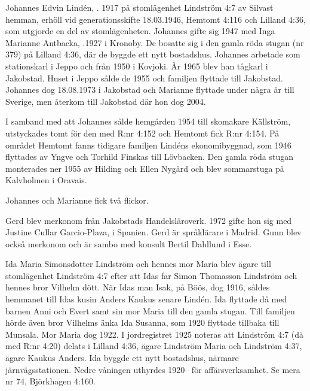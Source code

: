 %
Johannes Edvin Lindén, . 1917 på stomlägenhet Lindström 4:7 av Silvast hemman, erhöll vid generationsskifte 18.03.1946, Hemtomt 4:116 och Lilland 4:36, som utgjorde en del av stomlägenheten. Johannes gifte sig 1947 med Inga Marianne Antbacka, .1927 i Kronoby. De bosatte sig i den gamla röda stugan (nr 379) på Lilland 4:36, där de byggde ett nytt bostadshus. Johannes arbetade som stationskarl i Jeppo och från 1950 i Kovjoki. År 1965 blev han tågkarl i Jakobstad. Huset i Jeppo sålde de 1955 och familjen flyttade till Jakobstad. Johannes dog 18.08.1973 i Jakobstad och Marianne flyttade under några år till Sverige, men återkom till Jakobstad där hon dog 2004.

I samband med att Johannes sålde hemgården 1954 till skomakare Källström, utstyckades tomt för den med R:nr 4:152 och Hemtomt fick R:nr 4:154. På området Hemtomt fanns tidigare familjen Lindéns ekonomibyggnad, som 1946 flyttades av Yngve och Torhild Finskas till Lövbacken. Den gamla röda stugan monterades ner 1955 av Hilding och Ellen Nygård och blev sommarstuga på Kalvholmen i Oravais.

Johannes och Marianne fick två flickor.
\begin{jhchildren}
  \item {}
  \item {}
\end{jhchildren}
Gerd blev merkonom från Jakobstads Handelsläroverk. 1972 gifte hon sig med Justine Cullar Garcio-Plaza,  i Spanien. Gerd är språklärare i Madrid. Gunn blev också merkonom och är sambo med konsult Bertil Dahllund i Esse.


%
Ida Maria Simonsdotter Lindström och hennes mor Maria blev ägare till stomlägenhet Lindström 4:7 efter att Idas far Simon Thomasson Lindström och hennes bror Vilhelm dött. När Idas man Isak,  på Böös, dog 1916, såldes hemmanet till Idas kusin Anders Kaukus senare Lindén. Ida flyttade då med barnen Anni och Evert samt sin mor Maria till den gamla stugan. Till familjen hörde även bror Vilhelms änka Ida Susanna, som 1920 flyttade tillbaka till Munsala. Mor Maria dog 1922. I jordregistret 1925 noteras att Lindström 4:7 (då med R:nr 4:20) delats i Lilland 4:36, ägare Lindström Maria och Lindström 4:37, ägare Kaukus Anders. Ida byggde ett nytt bostadshus, närmare järnvägsstationen. Nedre våningen uthyrdes 1920-- för affärsverksamhet. Se mera nr 74, Björkhagen 4:160.


